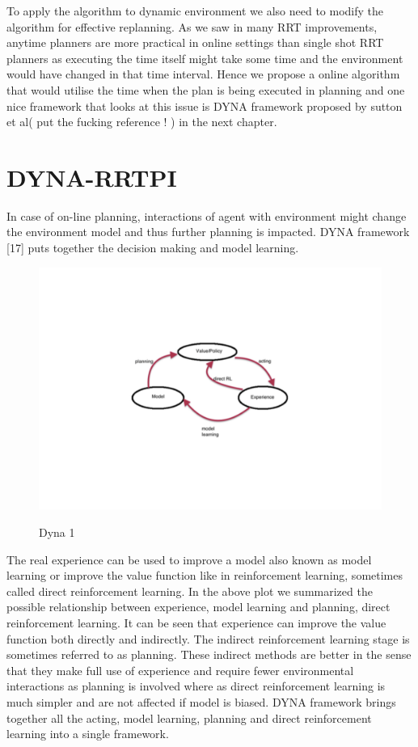 \documentclass[MTech]{iitmdiss}
\begin{document}
To apply the algorithm to dynamic environment we also need to modify the algorithm for effective replanning. As we saw in many RRT improvements, anytime planners are more practical in online settings than single shot RRT planners as executing the time itself might take some time and the environment would have changed in that time interval. Hence we propose a online algorithm that would utilise the time when the plan is being executed in planning and one nice framework that looks at this issue is DYNA framework proposed by sutton et al( put the fucking reference ! ) in the next chapter.

\section{DYNA-RRTPI}

In case of on-line planning, interactions of agent with environment might change the environment model and thus further planning is impacted. DYNA framework [17] puts together the decision making and model learning.
\begin{figure}[htpb]
   \begin{center}
     \resizebox{120mm}{120mm} {\includegraphics {dyna1}}
     \caption {Dyna 1 }
   \label{fig:dyna-1}
   \end{center}
 \end{figure}
The real experience can be used to improve a model also known as model learning or improve the value function like in reinforcement learning, sometimes called direct reinforcement learning. In the above plot we summarized the possible relationship between experience, model learning and planning, direct reinforcement learning. It can be seen that experience can improve the value function both directly and indirectly. The indirect reinforcement learning stage is sometimes referred to as planning. These indirect methods are better in the sense that they make full use of experience and require fewer environmental interactions as planning is involved where as direct reinforcement learning is much simpler and are not affected if model is biased. DYNA framework brings together all the acting, model learning, planning and direct reinforcement learning into a single framework.
\end{document}
